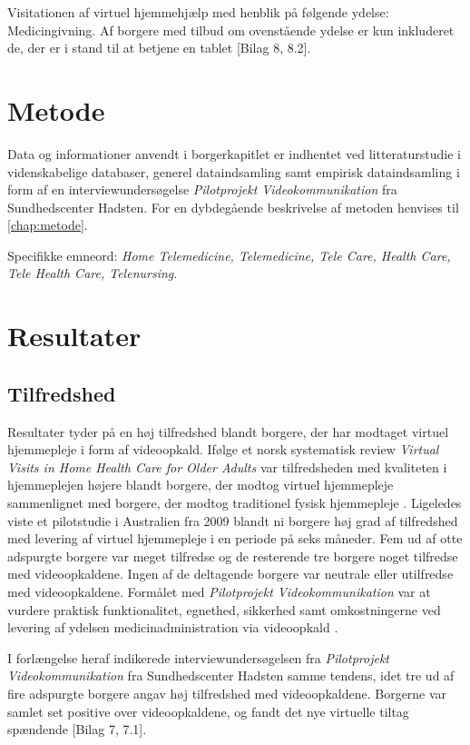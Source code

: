 Visitationen af virtuel hjemmehjælp med henblik på følgende ydelse: Medicingivning. Af borgere med tilbud om ovenstående ydelse er kun inkluderet de, der er i stand til at betjene en tablet [Bilag 8, 8.2].

\section{Metode}
Data og informationer anvendt i borgerkapitlet er indhentet ved litteraturstudie i videnskabelige databaser, generel dataindsamling samt empirisk dataindsamling i form af en interviewundersøgelse \textit{Pilotprojekt Videokommunikation} fra Sundhedscenter Hadsten. For en dybdegående beskrivelse af metoden henvises til \vref{chap:metode}.

Specifikke emneord: \textit{Home Telemedicine, Telemedicine, Tele Care, Health Care, Tele Health Care, Telenursing}.

\section{Resultater}

\subsection{Tilfredshed}
Resultater tyder på en høj tilfredshed blandt borgere, der har modtaget virtuel hjemmepleje i form af videoopkald. Ifølge et norsk systematisk review \textit{Virtual Visits in Home Health Care for Older Adults} var tilfredsheden med kvaliteten i hjemmeplejen højere blandt borgere, der modtog virtuel hjemmepleje sammenlignet med borgere, der modtog traditionel fysisk hjemmepleje \cite{Baf2}. Ligeledes viste et pilotstudie i Australien fra 2009 blandt ni borgere høj grad af tilfredshed med levering af virtuel hjemmepleje i en periode på seks måneder. Fem ud af otte adspurgte borgere var meget tilfredse og de resterende tre borgere noget tilfredse med videoopkaldene. Ingen af de deltagende borgere var neutrale eller utilfredse med videoopkaldene. Formålet med \textit{Pilotprojekt Videokommunikation} var at vurdere praktisk funktionalitet, egnethed, sikkerhed samt omkostningerne ved levering af ydelsen medicinadministration via videoopkald \cite{wade}. 

I forlængelse heraf indikerede interviewundersøgelsen fra \textit{Pilotprojekt Videokommunikation} fra Sundhedscenter Hadsten samme tendens, idet tre ud af fire adspurgte borgere angav høj tilfredshed med videoopkaldene. Borgerne var samlet set positive over videoopkaldene, og fandt det nye virtuelle tiltag spændende [Bilag 7, 7.1]. 


